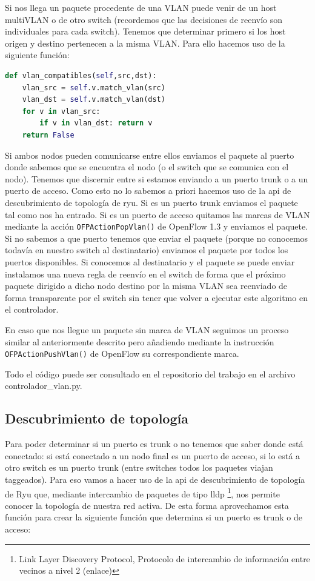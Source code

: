 Si nos llega un paquete procedente de una VLAN puede venir de un host multiVLAN o de otro switch (recordemos que las decisiones de reenvío son individuales para cada switch). Tenemos que determinar primero si los host origen y destino pertenecen a la misma VLAN. Para ello hacemos uso de la siguiente función:

\begin{lstlisting}[language=Python, label=lst:vlan-compatible, caption={Función que determina si dos nodos pertenencen a la misma VlAN}]
def vlan_compatibles(self,src,dst):
    vlan_src = self.v.match_vlan(src)
    vlan_dst = self.v.match_vlan(dst)
    for v in vlan_src:
        if v in vlan_dst: return v
    return False
\end{lstlisting}

Si ambos nodos pueden comunicarse entre ellos enviamos el paquete al puerto donde sabemos que se encuentra el nodo (o el switch que se comunica con el nodo). Tenemos que discernir entre si estamos enviando a un puerto trunk o a un puerto de acceso. Como esto no lo sabemos a priori hacemos uso de la api de descubrimiento de topología de ryu. Si es un puerto trunk enviamos el paquete tal como nos ha entrado. Si es un puerto de acceso quitamos las marcas de VLAN mediante la acción \lstinline{OFPActionPopVlan()} de OpenFlow 1.3 y enviamos el paquete. Si no sabemos a que puerto tenemos que enviar el paquete (porque no conocemos todavía en nuestro switch al destinatario) enviamos el paquete por todos los puertos disponibles. Si conocemos al destinatario y el paquete se puede enviar instalamos una nueva regla de reenvío en el switch de forma que el próximo paquete dirigido a dicho nodo destino por la misma VLAN sea reenviado de forma transparente por el switch sin tener que volver a ejecutar este algoritmo en el controlador.

En caso que nos llegue un paquete sin marca de VLAN seguimos un proceso similar al anteriormente descrito pero añadiendo mediante la instrucción \lstinline{OFPActionPushVlan()} de OpenFlow su correspondiente marca.

Todo el código puede ser consultado en el repositorio del trabajo en el archivo controlador\_vlan.py.

\subsection{Descubrimiento de topología}

Para poder determinar si un puerto es trunk o no tenemos que saber donde está conectado: si está conectado a un nodo final es un puerto de acceso, si lo está a otro switch es un puerto trunk (entre switches todos los paquetes viajan taggeados). Para eso vamos a hacer uso de la api de descubrimiento de topología de Ryu que, mediante intercambio de paquetes de tipo \acrshort{lldp} \footnote{Link Layer Discovery Protocol, Protocolo de intercambio de información entre vecinos a nivel 2 (enlace)}, nos permite conocer la topología de nuestra red activa. De esta forma aprovechamos esta función para crear la siguiente función que determina si un puerto es trunk o de acceso:

